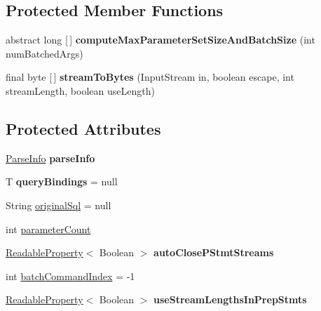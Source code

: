 \subsection*{Protected Member Functions}
\begin{DoxyCompactItemize}
\item 
\mbox{\label{classcom_1_1mysql_1_1cj_1_1_abstract_prepared_query_a29bac70aa2edad992b03494e5f7f97ef}} 
abstract long \mbox{[}$\,$\mbox{]} {\bfseries compute\+Max\+Parameter\+Set\+Size\+And\+Batch\+Size} (int num\+Batched\+Args)
\item 
\mbox{\label{classcom_1_1mysql_1_1cj_1_1_abstract_prepared_query_a2b738d5bb8d4d149721d0d59e42253cc}} 
final byte \mbox{[}$\,$\mbox{]} {\bfseries stream\+To\+Bytes} (Input\+Stream in, boolean escape, int stream\+Length, boolean use\+Length)
\end{DoxyCompactItemize}
\subsection*{Protected Attributes}
\begin{DoxyCompactItemize}
\item 
\mbox{\label{classcom_1_1mysql_1_1cj_1_1_abstract_prepared_query_adc622ebab9af7699a66fbbae03c910f3}} 
\mbox{\hyperlink{classcom_1_1mysql_1_1cj_1_1_parse_info}{Parse\+Info}} {\bfseries parse\+Info}
\item 
\mbox{\label{classcom_1_1mysql_1_1cj_1_1_abstract_prepared_query_a0d53ba1433f909085f14d0b1606faeca}} 
T {\bfseries query\+Bindings} = null
\item 
String \mbox{\hyperlink{classcom_1_1mysql_1_1cj_1_1_abstract_prepared_query_a06bb5d3e19f687e01fb4274e1f6f4f6a}{original\+Sql}} = null
\item 
int \mbox{\hyperlink{classcom_1_1mysql_1_1cj_1_1_abstract_prepared_query_a52a040d3c51f2a35b9c257edf897c6f0}{parameter\+Count}}
\item 
\mbox{\label{classcom_1_1mysql_1_1cj_1_1_abstract_prepared_query_a0c4bf92edc2656fb5a35ad26415f7a91}} 
\mbox{\hyperlink{interfacecom_1_1mysql_1_1cj_1_1conf_1_1_readable_property}{Readable\+Property}}$<$ Boolean $>$ {\bfseries auto\+Close\+P\+Stmt\+Streams}
\item 
int \mbox{\hyperlink{classcom_1_1mysql_1_1cj_1_1_abstract_prepared_query_abf8b65895d25af2ce73ef93f141d8c44}{batch\+Command\+Index}} = -\/1
\item 
\mbox{\label{classcom_1_1mysql_1_1cj_1_1_abstract_prepared_query_adc502931c1f36d8f058dc6af52981a0b}} 
\mbox{\hyperlink{interfacecom_1_1mysql_1_1cj_1_1conf_1_1_readable_property}{Readable\+Property}}$<$ Boolean $>$ {\bfseries use\+Stream\+Lengths\+In\+Prep\+Stmts}
\end{DoxyCompactItemize}
